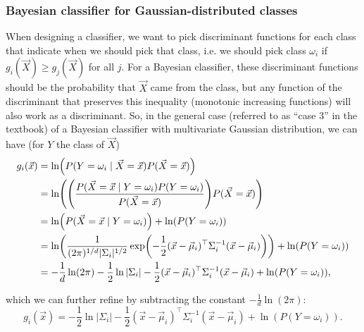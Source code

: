 \documentclass[headings=optiontoheadandtoc,listof=totoc,parskip=full]{scrartcl}
\begin{document}
\subsubsection{Bayesian classifier for Gaussian-distributed classes}

When designing a classifier, we want to pick discriminant functions for each class that indicate when we should pick that class, i.e. we should pick class $\omega_i$ if $g_i(\vec X) \geq g_j(\vec X)$ for all $j$. For a Bayesian classifier, these discriminant functions should be the probability that $\vec X$ came from the class, but any function of the discriminant that preserves this inequality (monotonic increasing functions) will also work as a discriminant. So, in the general case (referred to as ``case 3'' in the textbook) of a Bayesian classifier with multivariate Gaussian distribution, we can have (for $Y$ the class of $\vec X$)
\begin{align*}
	g_i(\vec x) &= \ln(P(Y = \omega_i \mid \vec X = \vec x)P(\vec X = \vec x))\\
		&= \ln(\qty(\frac{P(\vec X = \vec x \mid Y = \omega_i)P(Y = \omega_i)}{P(\vec X = \vec x)})P(\vec X = \vec x))\\
		&= \ln(P(\vec X = \vec x \mid Y = \omega_i)) + \ln(P(Y = \omega_i))\\
		&= \ln(\frac{1}{(2\pi)^{1/d}|\Sigma_i|^{1/2}}\exp(-\frac{1}{2}(\vec x - \vec\mu_i)^\top \Sigma_i^{-1} (\vec x - \vec\mu_i))) + \ln(P(Y = \omega_i))\\
		&= -\frac{1}{d}\ln(2\pi) - \frac{1}{2}\ln|\Sigma_i| - \frac{1}{2}(\vec x - \vec\mu_i)^\top \Sigma_i^{-1} (\vec x - \vec\mu_i) + \ln(P(Y = \omega_i)),
\end{align*}

which we can further refine by subtracting the constant $-\frac{1}{d}\ln(2\pi)$:
\begin{equation}
	g_i(\vec x) = - \frac{1}{2}\ln|\Sigma_i| - \frac{1}{2}(\vec x - \vec\mu_i)^\top \Sigma_i^{-1} (\vec x - \vec\mu_i) + \ln(P(Y = \omega_i)). \label{eq:dicriminant-case3}
\end{equation}
\end{document}

